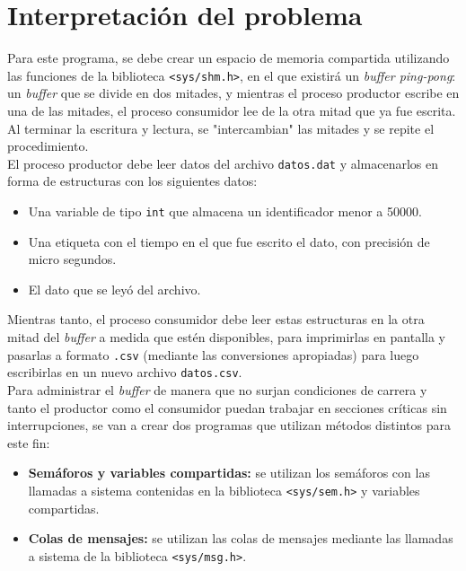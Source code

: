 \section{Interpretación del problema}
Para este programa, se debe crear un espacio de memoria compartida utilizando las funciones de la biblioteca \texttt{<sys/shm.h>}, en el que existirá un \textit{buffer ping-pong}: un \textit{buffer} que se divide en dos mitades, y mientras el proceso productor escribe en una de las mitades, el proceso consumidor lee de la otra mitad que ya fue escrita. Al terminar la escritura y lectura, se "intercambian" las mitades y se repite el procedimiento.\\

El proceso productor debe leer datos del archivo \texttt{datos.dat} y almacenarlos en forma de estructuras con los siguientes datos:\\

\begin{itemize}
    \item Una variable de tipo \texttt{int} que almacena un identificador menor a 50000.
    \item Una etiqueta con el tiempo en el que fue escrito el dato, con precisión de micro segundos.
    \item El dato que se leyó del archivo.\\
\end{itemize}

Mientras tanto, el proceso consumidor debe leer estas estructuras en la otra mitad del \textit{buffer} a medida que estén disponibles, para imprimirlas en pantalla y pasarlas a formato \texttt{.csv} (mediante las conversiones apropiadas) para luego escribirlas en un nuevo archivo \texttt{datos.csv}.\\

Para administrar el \textit{buffer} de manera que no surjan condiciones de carrera y tanto el productor como el consumidor puedan trabajar en secciones críticas sin interrupciones, se van a crear dos programas que utilizan métodos distintos para este fin:\\

\begin{itemize}
    \item \textbf{Semáforos y variables compartidas:} se utilizan los semáforos con las llamadas a sistema contenidas en la biblioteca \texttt{<sys/sem.h>} y variables compartidas.
    \item \textbf{Colas de mensajes:} se utilizan las colas de mensajes mediante las llamadas a sistema de la biblioteca \texttt{<sys/msg.h>}.\\
\end{itemize}

